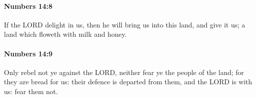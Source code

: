 		\paragraph{Numbers 14:8} %
			\label{NUMBERS-14-8}

			If the LORD delight in us, then he will bring us into this land, and give it us; a land which floweth with milk and honey.


		\paragraph{Numbers 14:9} %
			\label{NUMBERS-14-9}

			Only rebel not ye against the LORD, neither fear ye the people of the land; for they are bread for us: their defence is departed from them, and the LORD is with us: fear them not.


